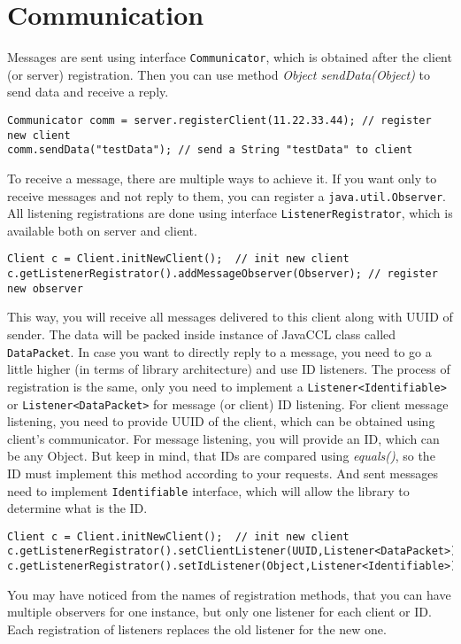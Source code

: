\documentclass[a4paper,12pt]{article}
\newcommand{\classname}[1]{\texttt{#1}}
\begin{document}
\section{Communication}
Messages are sent using interface \classname{Communicator}, which is obtained after the client (or server) registration. Then you can use method \textit{Object sendData(Object)} to send data and receive a reply.
\begin{lstlisting}
Communicator comm = server.registerClient(11.22.33.44);	// register new client
comm.sendData("testData"); // send a String "testData" to client
\end{lstlisting}
To receive a message, there are multiple ways to achieve it. If you want only to receive messages and not reply to them, you can register a \classname{java.util.Observer}. All listening registrations are done using interface \classname{ListenerRegistrator}, which is available both on server and client.
\begin{lstlisting}
Client c = Client.initNewClient();	// init new client
c.getListenerRegistrator().addMessageObserver(Observer); // register new observer
\end{lstlisting}
This way, you will receive all messages delivered to this client along with UUID of sender. The data will be packed inside instance of JavaCCL class called \classname{DataPacket}.
In case you want to directly reply to a message, you need to go a little higher (in terms of library architecture) and use ID listeners. The process of registration is the same, only you need to implement a \classname{Listener<Identifiable>} or \classname{Listener<DataPacket>} for message (or client) ID listening. For client message listening, you need to provide UUID of the client, which can be obtained using client's communicator. For message listening, you will provide an ID, which can be any Object. But keep in mind, that IDs are compared using \textit{equals()}, so the ID must implement this method according to your requests. And sent messages need to implement \classname{Identifiable} interface, which will allow the library to determine what is the ID.
\begin{lstlisting}
Client c = Client.initNewClient();	// init new client
c.getListenerRegistrator().setClientListener(UUID,Listener<DataPacket>);
c.getListenerRegistrator().setIdListener(Object,Listener<Identifiable>);
\end{lstlisting}
You may have noticed from the names of registration methods, that you can have multiple observers for one instance, but only one listener for each client or ID. Each registration of listeners replaces the old listener for the new one.
\clearpage
\end{document}
